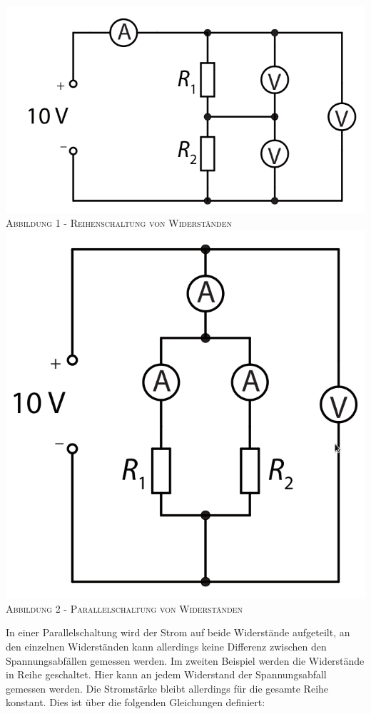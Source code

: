 \documentclass[11pt]{article}
\begin{document}
\begin{center}
\includegraphics[scale=0.3]{./Reihe.png}\\
\small \textsc{Abbildung 1 - Reihenschaltung von Widerständen}\\
\includegraphics[scale=0.3]{./parallel.png}\\
\small \textsc{Abbildung 2 - Parallelschaltung von Widerständen}\\
\end{center}
In einer Parallelschaltung wird der Strom auf beide Widerstände aufgeteilt, an den einzelnen Widerständen kann allerdings keine Differenz zwischen den Spannungsabfällen gemessen werden. Im zweiten Beispiel werden die Widerstände in Reihe geschaltet. Hier kann an jedem Widerstand der Spannungsabfall gemessen werden. Die Stromstärke bleibt allerdings für die gesamte Reihe konstant. Dies ist über die folgenden Gleichungen definiert:
\end{document}
